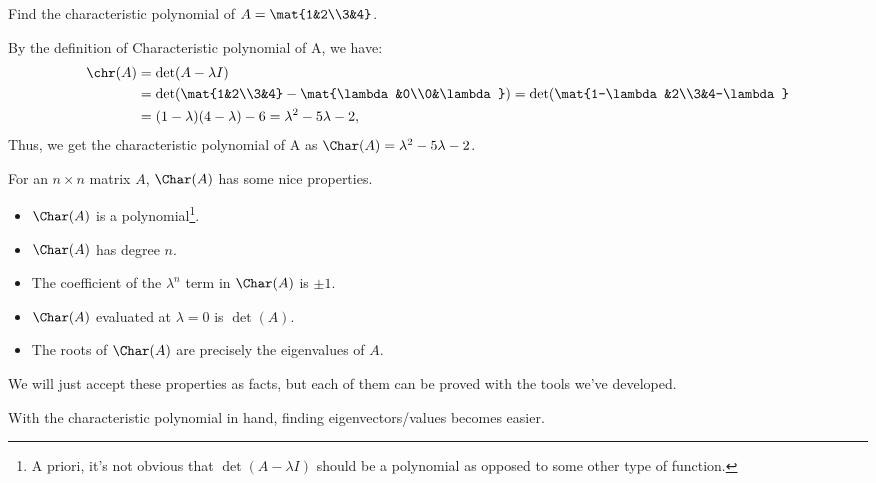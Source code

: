
\begin{example}
	Find the characteristic polynomial of $A=\mat{1&2\\3&4}$.
	
	By the definition of Characteristic polynomial of A, we have: 
	\begin{align*}
	    \chr(A) &=\det(A-\lambda I)\\
	            &=\det(\mat{1&2\\3&4}-\mat{\lambda&0\\0&\lambda})=\det(\mat{1-\lambda&2\\3&4-\lambda}\\
	            &=(1-\lambda)(4-\lambda) - 6=\lambda^2 -5\lambda-2,
	\end{align*}
	Thus, we get the characteristic polynomial of A as $\Char(A)=\lambda^2 -5\lambda-2$.
	
	
\end{example}

For an $n\times n$ matrix $A$, $\Char(A)$ has some nice properties.
\begin{itemize}
	\item $\Char(A)$ is a polynomial\footnote{ A priori, it's not obvious that $\det(A-\lambda I)$
	should be a polynomial as opposed to some other type of function.}.
	\item $\Char(A)$ has degree $n$.
	\item The coefficient of the $\lambda^n$ term in $\Char(A)$ is $\pm1$.
	\item $\Char(A)$ evaluated at $\lambda = 0$ is $\det(A)$.
	\item The roots of $\Char(A)$ are precisely the eigenvalues of $A$.
\end{itemize}
We will just accept these properties as facts, but each of them can be proved with the tools we've developed.


With the characteristic polynomial in hand, finding eigenvectors/values becomes easier.


